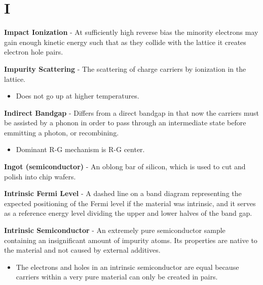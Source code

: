 \section{I}
    \textbf{Impact Ionization} - At sufficiently high reverse bias the minority electrons may gain enough kinetic energy such that as they collide with the lattice it creates electron hole pairs.

\vspace{0.5cm}
\noindent
    \textbf{Impurity Scattering} - The scattering of charge carriers by ionization in the lattice.
    \vspace{0.15cm}
    \begin{itemize}
        \setlength\itemsep{0.5em}
        \item{Does not go up at higher temperatures.}
    \end{itemize}
\vspace{0.5cm}
    \textbf{Indirect Bandgap} - Differs from a direct bandgap in that now the carriers must be assisted by a phonon in order to pass through an intermediate state before emmitting a photon, or recombining.
    \begin{itemize}
        \setlength\itemsep{0.5em}
        \item{Dominant R-G mechanism is R-G center.}
    \end{itemize}
\vspace{0.5cm}
    \textbf{Ingot (semiconductor)} - An oblong bar of silicon, which is used to cut and polish into chip wafers.
    
\vspace{0.5cm}
    \textbf{Intrinsic Fermi Level} - A dashed line on a band diagram representing the expected positioning of the Fermi level if the material was intrinsic, and it serves as a reference energy level dividing the upper and lower halves of the band gap.
    
\vspace{0.5cm}
\noindent
    \textbf{Intrinsic Semiconductor} - An extremely pure semiconductor sample containing an insignificant amount of impurity atoms.  Its properties are native to the material and not caused by external additives.
    \vspace{0.15cm}
    \begin{itemize}
        \setlength\itemsep{0.5em}
        \item{The electrons and holes in an intrinsic semiconductor are equal because carriers within a very pure material can only be created in pairs.}
    \end{itemize}
